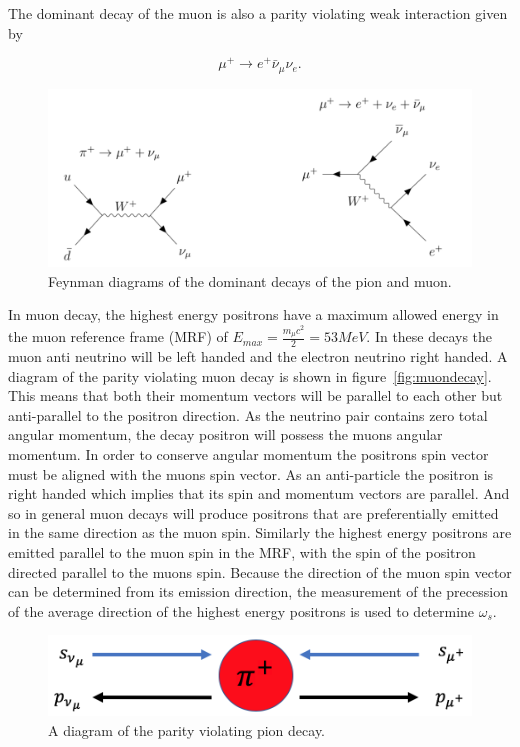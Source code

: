 The dominant decay of the muon is also a parity violating weak interaction given by

\begin{equation}
{\mu^{+}}\rightarrow{e^{+}}\bar{\nu}{_\mu}\nu{_e}.
\end{equation}

\begin{figure}[th]
\centering
\includegraphics[scale=0.75]{Figures/muonpiondecay}
\decoRule
\caption{Feynman diagrams of the dominant decays of the pion and muon.}
\label{fig:muonpiondecay}
\end{figure}

In muon decay, the highest energy positrons have a maximum allowed energy in the muon reference frame (MRF) of $E_{max}=\frac{m_{\mu}c^2}{2}=53MeV$. In these decays the muon anti neutrino will be left handed and the electron neutrino right handed. A diagram of the parity violating muon decay is shown in figure~\ref{fig:muondecay}. This means that both their momentum vectors will be parallel to each other but anti-parallel to the positron direction. As the neutrino pair contains zero total angular momentum, the decay positron will possess the muons angular momentum. In order to conserve angular momentum the positrons spin vector must be aligned with the muons spin vector. As an anti-particle the positron is right handed which implies that its spin and momentum vectors are parallel. And so in general muon decays will produce positrons that are preferentially emitted in the same direction as the muon spin. Similarly the highest energy positrons are emitted parallel to the muon spin in the MRF, with the spin of the positron directed parallel to the muons spin. Because the direction of the muon spin vector can be determined from its emission direction, the measurement of the precession of the average direction of the highest energy positrons is used to determine $\omega_{s}$.

\begin{figure}[th]
\centering
\includegraphics[scale=0.8]{Figures/piondecay.png}
\decoRule
\caption{A diagram of the parity violating pion decay.}
\label{fig:piondecay}
\end{figure}

